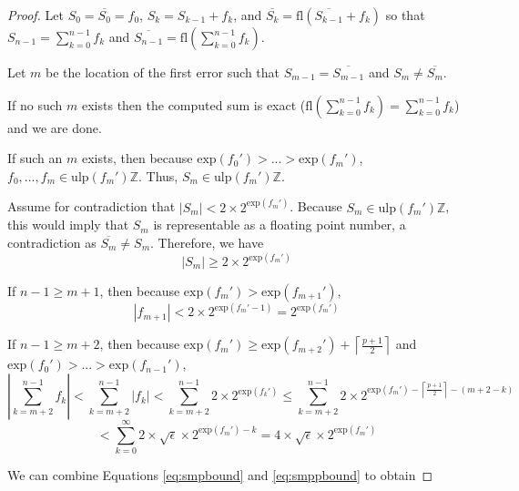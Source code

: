 \documentclass[12pt]{article}
\providecommand{\ceil}[1]{\left \lceil #1 \right \rceil }
\providecommand{\Z}{\ensuremath{\mathbb{Z}}}
\providecommand{\exp}{\ensuremath{\text{exp}}}
\providecommand{\ulp}{\ensuremath{\text{ulp}}}
\providecommand{\fl}{\ensuremath{\text{fl}}}
\theoremstyle{plain}
\numberwithin{equation}{section}
\begin{document}
    \begin{proof}
      Let $S_0 = \overline{S_0} = f_0$, $S_k = S_{k - 1} + f_k$, and $\overline{S_k} = \fl(\overline{S_{k - 1}} + f_k)$ so that $S_{n - 1} = \sum \limits_{k = 0}^{n - 1} f_k$ and $\overline{S_{n - 1}} = \fl(\sum \limits_{k = 0}^{n - 1} f_k)$.

      Let $m$ be the location of the first error such that $S_{m - 1} = \overline{S_{m - 1}}$ and $S_{m} \neq \overline{S_{m}}$.

      If no such $m$ exists then the computed sum is exact ($\fl(\sum \limits_{k = 0}^{n - 1} f_k) = \sum \limits_{k = 0}^{n - 1} f_k$) and we are done.

      If such an $m$ exists, then because $\exp(f_0') > ... > \exp(f_m')$, $f_0, ..., f_m \in \ulp(f_m')\Z$. Thus, $S_m \in \ulp(f_m')\Z$.

      Assume for contradiction that $|S_m| < 2 \times 2^{\exp(f_m')}$. Because $S_m \in \ulp(f_m')\Z$, this would imply that $S_m$ is representable as a floating point number, a contradiction as $\overline{S_m} \neq S_m$. Therefore, we have
      \begin{equation}
        |S_m| \geq 2 \times 2^{\exp(f_m')}
        \label{eq:smbound}
      \end{equation}

      If $n - 1 \geq m + 1$, then because $\exp(f_m') > \exp(f_{m + 1}')$,
      \begin{equation}
        |f_{m + 1}| < 2\times2^{\exp(f_m' - 1)} = 2^{\exp(f_m')}
        \label{eq:smpbound}
      \end{equation}

      If $n - 1 \geq m + 2$, then because $\exp(f_m') \geq \exp(f_{m + 2}') + \ceil{\frac{p + 1}{2}}$ and $\exp(f_0') > ... > \exp(f_{n - 1}')$,
      \begin{equation*}
        |\sum \limits_{k = m + 2}^{n - 1} f_k| < \sum \limits_{k = m + 2}^{n - 1} |f_k| < \sum \limits_{k = m + 2}^{n - 1} 2 \times 2^{\exp(f_k')} \leq \sum \limits_{k = m + 2}^{n - 1} 2 \times 2^{\exp(f_m') - \ceil{\frac{p + 1}{2}} - (m + 2 - k)}
      \end{equation*}
      \begin{equation}
        < \sum \limits_{k = 0}^{\infty} 2 \times \sqrt{\epsilon} \times 2^{\exp(f_m') - k} = 4 \times \sqrt\epsilon \times 2^{\exp(f_m')}
        \label{eq:smppbound}
      \end{equation}

      We can combine Equations \ref{eq:smpbound} and \ref{eq:smppbound} to obtain


\end{proof}
\end{document}
